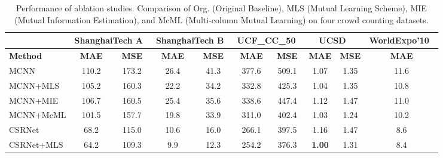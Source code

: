 \documentclass[sigconf]{acmart}
\begin{document}
\begin{table}[t]
\small
\caption{Performance of ablation studies. Comparison of Org. (Original Baseline), MLS (Mutual Learning Scheme), MIE (Mutual Information Estimation), and McML (Multi-column Mutual Learning) on four crowd counting datasets.}
\renewcommand\arraystretch{0.95}
\begin{center}
\vspace{-3mm}
\begin{tabular}{|l|cc|cc|cc|cc|c|}
\hline
& \multicolumn{2}{c|}{\textbf{ShanghaiTech A~\cite{MCNN-16}}} & \multicolumn{2}{c|}{\textbf{ShanghaiTech B~\cite{MCNN-16}}} & \multicolumn{2}{c|}{\textbf{UCF\_CC\_50~\cite{r-mrf-count-multi-source-13}}} & \multicolumn{2}{c|}{\textbf{UCSD~\cite{deep-crowd-scene-15}}} & \textbf{WorldExpo'10~\cite{r-count-privacy-preserving-08}} \\ \hline
\textbf{Method} & \textbf{MAE}         & \textbf{MSE}          & \textbf{MAE}         & \textbf{MSE}          & \textbf{MAE}        & \textbf{MSE}        & \textbf{MAE}     & \textbf{MSE}    & \textbf{MAE}          \\ \hline \hline
MCNN~\cite{MCNN-16}            & 110.2                & 173.2                 & 26.4                 & 41.3                  & 377.6               & 509.1               & 1.07             & 1.35            & 11.6                  \\
MCNN+MLS        & 105.2                & 160.3                 & 22.2                 & 34.2                  & 332.8               & 425.3               & 1.04             & 1.35            & 10.8                  \\
MCNN+MIE        & 106.7                & 160.5                 & 25.4                 & 35.6                  & 338.6               & 447.4               & 1.12             & 1.47            & 11.0                  \\
MCNN+McML       & 101.5                & 157.7                 & 19.8                 & 33.9                  & 311.0               & 402.4               & 1.03             & 1.24            & 10.2                  \\ \hline\hline
CSRNet~\cite{CSRNet-18}          & 68.2                 & 115.0                 & 10.6                 & 16.0                  & 266.1               & 397.5               & 1.16             & 1.47            & 8.6                   \\
CSRNet+MLS      & 64.2                 & 109.3                 & 9.9                  & 12.3                  & 254.2               & 376.3               & \textbf{1.00}    & 1.31            & 8.4                   \\

\end{tabular}
\end{center}
\end{table}
\end{document}
